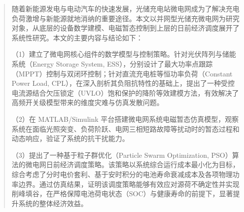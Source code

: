 \begin{abstract}
随着新能源发电与电动汽车的快速发展，光储充电站微电网成为了解决充电负荷激增与新能源就地消纳的重要途径。本文以并网型光储充微电网为研究对象，从底层的设备数学建模、电磁暂态控制到上层的日前经济调度展开了系统性研究。本文的主要内容与结论如下：

（1）建立了微电网核心组件的数学模型与控制策略。针对光伏阵列与储能系统（Energy Storage System, ESS），分别设计了最大功率点跟踪（MPPT）控制与双闭环控制；针对直流充电桩等恒功率负荷（Constant Power Load, CPL），在深入剖析其负阻抗特性的基础上，提出了一种受控电流源结合欠压锁定（UVLO）饱和保护的降阶等效建模方法，有效解决了高频开关级模型带来的维度灾难与仿真发散问题。

（2）在 MATLAB/Simulink 平台搭建微电网系统电磁暂态仿真模型，观察系统在面临光照突变、负荷阶跃、电网三相短路故障等扰动时的暂态过程和动态响应，验证了系统的抗干扰能力。

（3）提出了一种基于粒子群优化（Particle Swarm Optimization, PSO）算法的微电网日前经济调度策略。该策略以系统综合运行成本最小化为目标，综合考虑了分时电价套利、基于安时积分的电池寿命衰减成本及各项物理功率边界。通过仿真结果，证明该调度策略能够有效应对源荷不确定性并实现削峰填谷，在严格保障电池荷电状态（SOC）与健康寿命的前提下，显著提升系统的整体经济效益。

\end{abstract}

